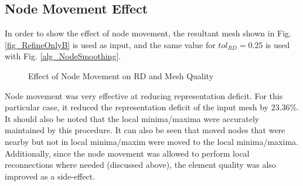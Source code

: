 \subsection{Node Movement Effect}
In order to show the effect of node movement, the resultant mesh shown
in Fig. \ref{fig_RefineOnlyB} is used as input, and the same value for
$tol_{RD} = 0.25$ is used with Fig. \ref{alg_NodeSmoothing}.

\begin{figure}[h!]
  \begin{center}
 
  \caption{Effect of Node Movement on RD and Mesh Quality}
  \label{fig_NodeSmoothing}

  \end{center}
\end{figure}

Node movement was very effective at reducing representation deficit.
For this particular case, it reduced the representation deficit of the
input mesh by $23.36\%$. It should also be noted that the local
minima/maxima were accurately maintained by this procedure. It can also
be seen that moved nodes that were nearby but not in local minima/maxim
were moved to the local minima/maxima. Additionally, since the node
movement was allowed to perform local reconnections where needed
(discussed above), the element quality was also improved as a
side-effect.

